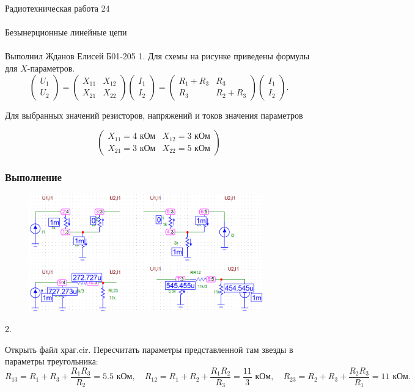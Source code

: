 \documentclass{astroedu-lab}
\begin{document}
\begin{problem}{\huge Радиотехническая работа 24\\\\Безынерционные линейные цепи\\\\Выполнил Жданов Елисей Б01-205}
1. Для схемы на рисунке приведены формулы для $X$-параметров.
$$
\left(\begin{array}{l}
U_1 \\
U_2
\end{array}\right)=\left(\begin{array}{ll}
X_{11} & X_{12} \\
X_{21} & X_{22}
\end{array}\right)\left(\begin{array}{l}
I_1 \\
I_2
\end{array}\right)=\left(\begin{array}{cc}
R_1+R_3 & R_3 \\
R_3 & R_2+R_3
\end{array}\right)\left(\begin{array}{l}
I_1 \\
I_2
\end{array}\right) .
$$

Для выбранных значений резисторов, напряжений и токов значения параметров

$$
\left(\begin{array}{ll}
X_{11} = 4 \text{ кОм} & X_{12} = 3 \text{ кОм} \\
X_{21} = 3 \text{ кОм} & X_{22} = 5 \text{ кОм}
\end{array}\right)
$$

\subsubsection{Выполнение}

\begin{figure}[!h]
	\centering
	\includegraphics[width=0.9\textwidth]{18c.png}
	\label{fig:boiler}
\end{figure}

2.

Открыть файл храг.cir. Пересчитать параметры представленной там звезды в параметры треугольника:
$$
R_{13}=R_1+R_3+\frac{R_1 R_3}{R_2} = 5.5 \text{ кОм}, \quad R_{12}=R_1+R_2+\frac{R_1 R_2}{R_3} = \frac{11}{3} \text{ кОм}, \quad R_{23}=R_2+R_3+\frac{R_2 R_3}{R_1} = 11 \text{ кОм} .
$$


\end{problem}
\end{document}
